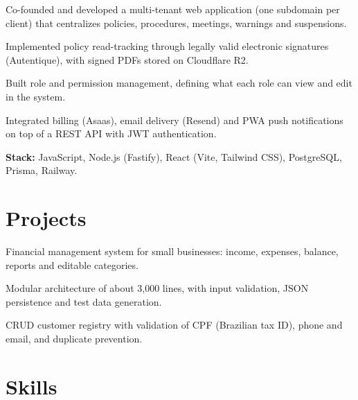 \documentclass[10pt]{article}
\begin{document}
\begin{itens}
  \item Co-founded and developed a multi-tenant web application (one subdomain per client) that centralizes policies, procedures, meetings, warnings and suspensions.
  \item Implemented policy read-tracking through legally valid electronic signatures (Autentique), with signed PDFs stored on Cloudflare R2.
  \item Built role and permission management, defining what each role can view and edit in the system.
  \item Integrated billing (Asaas), email delivery (Resend) and PWA push notifications on top of a REST API with JWT authentication.
  \item \textbf{Stack:} JavaScript, Node.js (Fastify), React (Vite, Tailwind CSS), PostgreSQL, Prisma, Railway.
\end{itens}

\section{Projects}
\begin{itens}
  \item Financial management system for small businesses: income, expenses, balance, reports and editable categories.
  \item Modular architecture of about 3,000 lines, with input validation, JSON persistence and test data generation.
\end{itens}

\begin{itens}
  \item CRUD customer registry with validation of CPF (Brazilian tax ID), phone and email, and duplicate prevention.
\end{itens}

\section{Skills}
\end{document}
